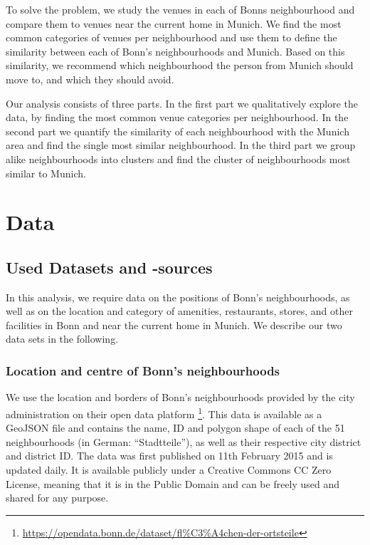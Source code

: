 \documentclass[UKenglish]{scrreprt}
\begin{document}
To solve the problem, we study the venues in each of Bonns neighbourhood and compare them to venues near the current home in Munich. We find the most common categories of venues per neighbourhood and use them to define the similarity between each of Bonn's neighbourhoods and Munich. Based on this similarity, we recommend which neighbourhood the person from Munich should move to, and which they should avoid.

Our analysis consists of three parts. In the first part we qualitatively explore the data, by finding the most common venue categories per neighbourhood. In the second part we quantify the similarity of each neighbourhood with the Munich area and find the single most similar neighbourhood. In the third part we group alike neighbourhoods into clusters and find the cluster of neighbourhoods most similar to Munich.
%
%

\chapter{Data}
\label{sec:Data}

\section{Used Datasets and -sources}
In this analysis, we require data on the positions of Bonn's neighbourhoods, as well as on the location and category of amenities, restaurants, stores, and other facilities in Bonn and near the current home in Munich. We describe our two data sets in the following.

\subsection{Location and centre of Bonn's neighbourhoods}
We use the location and borders of Bonn's neighbourhoods provided by the city administration on their open data platform \footnote{\href{https://opendata.bonn.de/dataset/fl\%C3\%A4chen-der-ortsteile}{https://opendata.bonn.de/dataset/fl\%C3\%A4chen-der-ortsteile}}\cite{Ortsteile}. This data is available as a GeoJSON file and contains the name, ID and polygon shape of each of the 51 neighbourhoods (in German: \enquote{Stadtteile}), as well as their respective city district and district ID.
The data was first published on 11th February 2015 and is updated daily. It is available publicly under a Creative Commons CC Zero License, meaning that 
it is in the Public Domain and can be freely used and shared for any purpose.
\end{document}
